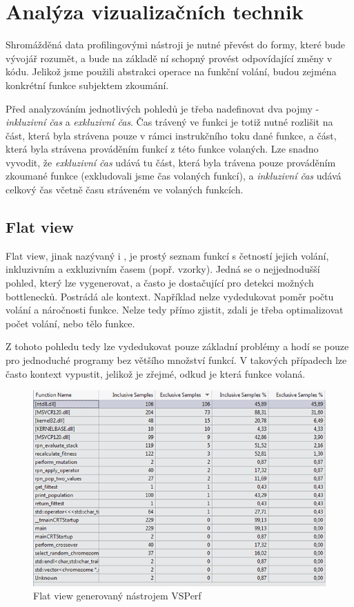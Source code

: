 \documentclass[czech,BP]{thesiskiv}
\begin{document}
\newpage

\chapter{Analýza vizualizačních technik}

Shromážděná data profilingovými nástroji je nutné převést do formy, které bude vývojář rozumět, a bude na základě ní schopný provést odpovídající změny v kódu. Jelikož jsme použili abstrakci operace na funkční volání, budou zejména konkrétní funkce subjektem zkoumání.

Před analyzováním jednotlivých pohledů je třeba nadefinovat dva pojmy - \emph{inkluzivní čas} a \emph{exkluzivní čas}. Čas trávený ve funkci je totiž nutné rozlišit na část, která byla strávena pouze v rámci instrukčního toku dané funkce, a část, která byla strávena prováděním funkcí z této funkce volaných. Lze snadno vyvodit, že \emph{exkluzivní čas} udává tu část, která byla trávena pouze prováděním zkoumané funkce (exkludovali jsme čas volaných funkcí), a \emph{inkluzivní čas} udává celkový čas včetně času stráveném ve volaných funkcích.

\section{Flat view}

Flat view, jinak nazývaný i , je prostý seznam funkcí s četností jejich volání, inkluzivním a exkluzivním časem (popř. vzorky). Jedná se o nejjednodušší pohled, který lze vygenerovat, a často je dostačující pro detekci možných bottlenecků. Postrádá ale kontext. Například nelze vydedukovat poměr počtu volání a náročnosti funkce. Nelze tedy přímo zjistit, zdali je třeba optimalizovat počet volání, nebo tělo funkce.

Z tohoto pohledu tedy lze vydedukovat pouze základní problémy a hodí se pouze pro jednoduché programy bez většího množství funkcí. V takových případech lze často kontext vypustit, jelikož je zřejmé, odkud je která funkce volaná.

\begin{figure}[h]
    \centering
    \includegraphics[interpolate,width=1.0\textwidth]{img/prof_flatview.png}
    \caption{Flat view generovaný nástrojem VSPerf}
    \label{obr:flatview}
\end{figure}
\end{document}
